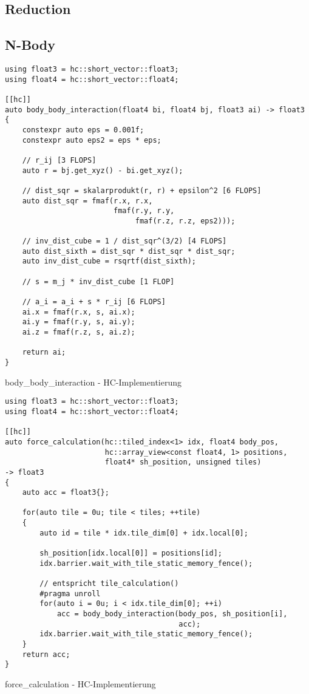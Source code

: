 \subsection{Reduction}
\subsection{N-Body}

\begin{code}
    \begin{verbatim}
using float3 = hc::short_vector::float3;
using float4 = hc::short_vector::float4;

[[hc]]
auto body_body_interaction(float4 bi, float4 bj, float3 ai) -> float3
{
    constexpr auto eps = 0.001f;
    constexpr auto eps2 = eps * eps;

    // r_ij [3 FLOPS]
    auto r = bj.get_xyz() - bi.get_xyz();

    // dist_sqr = skalarprodukt(r, r) + epsilon^2 [6 FLOPS]
    auto dist_sqr = fmaf(r.x, r.x,
                         fmaf(r.y, r.y,
                              fmaf(r.z, r.z, eps2)));

    // inv_dist_cube = 1 / dist_sqr^(3/2) [4 FLOPS]
    auto dist_sixth = dist_sqr * dist_sqr * dist_sqr;
    auto inv_dist_cube = rsqrtf(dist_sixth);

    // s = m_j * inv_dist_cube [1 FLOP]

    // a_i = a_i + s * r_ij [6 FLOPS]
    ai.x = fmaf(r.x, s, ai.x);
    ai.y = fmaf(r.y, s, ai.y);
    ai.z = fmaf(r.z, s, ai.z);

    return ai;
}
    \end{verbatim}
    \caption{body\_body\_interaction - HC-Implementierung}
    \label{anhang:hc:bodybodyinteraction}
\end{code}

\begin{code}
    \begin{verbatim}
using float3 = hc::short_vector::float3;
using float4 = hc::short_vector::float4;

[[hc]]
auto force_calculation(hc::tiled_index<1> idx, float4 body_pos,
                       hc::array_view<const float4, 1> positions,
                       float4* sh_position, unsigned tiles)
-> float3
{
    auto acc = float3{};

    for(auto tile = 0u; tile < tiles; ++tile)
    {
        auto id = tile * idx.tile_dim[0] + idx.local[0];

        sh_position[idx.local[0]] = positions[id];
        idx.barrier.wait_with_tile_static_memory_fence();

        // entspricht tile_calculation()
        #pragma unroll
        for(auto i = 0u; i < idx.tile_dim[0]; ++i)
            acc = body_body_interaction(body_pos, sh_position[i],
                                        acc);
        idx.barrier.wait_with_tile_static_memory_fence();
    }
    return acc;
}
    \end{verbatim}
    \caption{force\_calculation - HC-Implementierung}
    \label{anhang:hc:forcecalculation}
\end{code}


